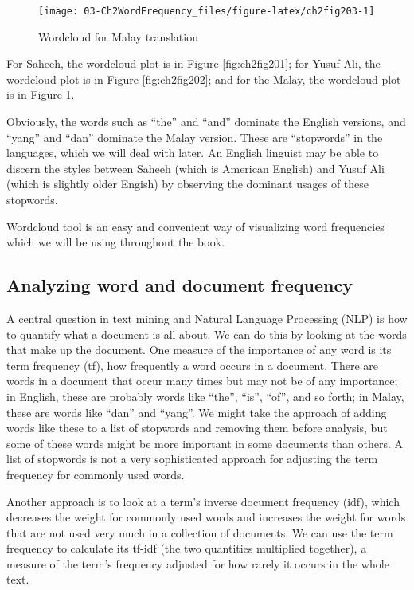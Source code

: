 \documentclass[
]{article}
\begin{document}
\begin{figure}

{\centering \texttt{[image: 03-Ch2WordFrequency\_files/figure-latex/ch2fig203-1]} 

}

\caption{Wordcloud for Malay translation}\label{fig:ch2fig203}
\end{figure}

For Saheeh, the wordcloud plot is in Figure \ref{fig:ch2fig201}; for Yusuf Ali, the wordcloud plot is in Figure \ref{fig:ch2fig202}; and for the Malay, the wordcloud plot is in Figure \ref{fig:ch2fig203}.

Obviously, the words such as ``the'' and ``and'' dominate the English versions, and ``yang'' and ``dan'' dominate the Malay version. These are ``stopwords'' in the languages, which we will deal with later. An English linguist may be able to discern the styles between Saheeh (which is American English) and Yusuf Ali (which is slightly older Engish) by observing the dominant usages of these stopwords.

Wordcloud tool is an easy and convenient way of visualizing word frequencies which we will be using throughout the book.

\hypertarget{analyzing-word-and-document-frequency}{%
\subsection{Analyzing word and document frequency}\label{analyzing-word-and-document-frequency}}

A central question in text mining and Natural Language Processing (NLP) is how to quantify what a document is all about. We can do this by looking at the words that make up the document. One measure of the importance of any word is its term frequency (tf), how frequently a word occurs in a document. There are words in a document that occur many times but may not be of any importance; in English, these are probably words like ``the'', ``is'', ``of'', and so forth; in Malay, these are words like ``dan'' and ``yang''. We might take the approach of adding words like these to a list of stopwords and removing them before analysis, but some of these words might be more important in some documents than others. A list of stopwords is not a very sophisticated approach for adjusting the term frequency for commonly used words.

Another approach is to look at a term's inverse document frequency (idf), which decreases the weight for commonly used words and increases the weight for words that are not used very much in a collection of documents. We can use the term frequency to calculate its tf-idf (the two quantities multiplied together), a measure of the term's frequency adjusted for how rarely it occurs in the whole text.
\end{document}
